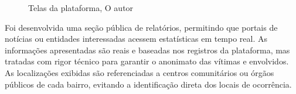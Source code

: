 \begin{figure}[H]
    \caption{Telas da plataforma, O autor}\label{fig:telas_plataforma}
\end{figure}
\par Foi desenvolvida uma seção pública de relatórios, permitindo que portais de notícias ou entidades interessadas acessem estatísticas em tempo real. As informações apresentadas são reais e baseadas nos registros da plataforma, mas tratadas com rigor técnico para garantir o anonimato das vítimas e envolvidos. As localizações exibidas são referenciadas a centros comunitários ou órgãos públicos de cada bairro, evitando a identificação direta dos locais de ocorrência.

